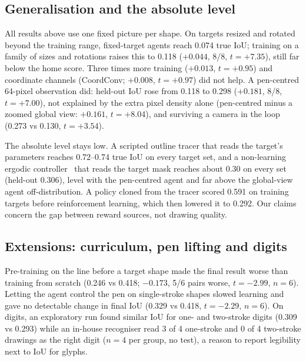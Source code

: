 \documentclass[conference]{IEEEtran}
\begin{document}
\subsection{Generalisation and the absolute level}
\label{sec:gen}
All results above use one fixed picture per shape. On targets resized and rotated beyond
the training range, fixed-target agents reach 0.074 true IoU; training on a family of %
sizes and rotations raises this to 0.118 ($+0.044$, 8/8, $t=+7.35$), still far below the %
home score. Three times more training ($+0.013$, $t=+0.95$) and coordinate channels %
(CoordConv; $+0.008$, $t=+0.97$) did not help. A pen-centred 64-pixel observation did: %
held-out IoU rose from 0.118 to 0.298 ($+0.181$, 8/8, $t=+7.00$), not explained by the %
extra pixel density alone (pen-centred minus a zoomed global view: $+0.161$, $t=+8.04$), %
and surviving a camera in the loop (0.273 vs 0.130, $t=+3.54$). %

The absolute level stays low. A scripted outline tracer that reads the target's parameters
reaches 0.72--0.74 true IoU on every target set, and a non-learning ergodic controller~\cite{D04} %
that reads the target mask reaches about 0.30 on every set (held-out 0.306), level with %
the pen-centred agent and far above the global-view agent off-distribution. A policy cloned
from the tracer scored 0.591 on training targets before reinforcement learning, which then %
lowered it to 0.292. Our claims concern the gap between reward sources, not drawing quality. %

\subsection{Extensions: curriculum, pen lifting and digits}
\label{sec:ext}
Pre-training on the line before a target shape made the final result worse than training
from scratch (0.246 vs 0.418; $-0.173$, 5/6 pairs worse, $t=-2.99$, $n=6$). Letting the %
agent control the pen on single-stroke shapes slowed learning and gave no detectable
change in final IoU (0.329 vs 0.418, $t=-2.29$, $n=6$). On digits, an exploratory run %
found similar IoU for one- and two-stroke digits (0.309 vs 0.293) while an in-house %
recogniser read 3 of 4 one-stroke and 0 of 4 two-stroke drawings as the right digit
($n=4$ per group, no test), a reason to report legibility next to IoU for glyphs.
\end{document}
